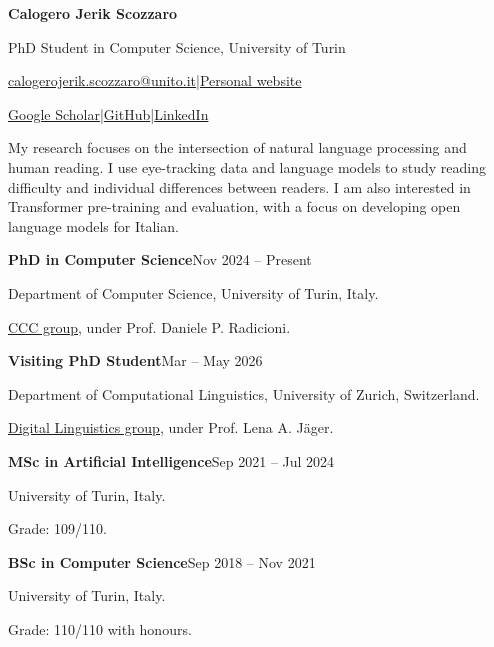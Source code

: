 \documentclass[10pt,a4paper]{article}
\newcommand{\cvsection}[1]{\par\vspace{14pt}{\large\bfseries #1}\par\vspace{4pt}{\color{rulecolor}\hrule}\vspace{8pt}}
\newcommand{\education}[4]{\par\textbf{#1}\hfill{\small\color{muted}#2}\par #3\par{\small\color{muted}#4}\par\vspace{7pt}}
\newcommand{\applicationdetails}{}
\begin{document}
\color{ink}
{\fontsize{25}{29}\selectfont\bfseries Calogero Jerik Scozzaro}\par
\vspace{4pt}
{\color{muted}PhD Student in Computer Science, University of Turin}\par
\vspace{5pt}
{\small\href{mailto:calogerojerik.scozzaro@unito.it}{calogerojerik.scozzaro@unito.it}\enspace\textcolor{muted}{|}\enspace\href{https://calogero-jerik-scozzaro.github.io/}{Personal website}}\par
{\small\href{https://scholar.google.com/citations?user=m3dCkVYAAAAJ}{Google Scholar}\enspace\textcolor{muted}{|}\enspace\href{https://github.com/calogero-jerik-scozzaro}{GitHub}\enspace\textcolor{muted}{|}\enspace\href{https://www.linkedin.com/in/calogero-jerik-scozzaro}{LinkedIn}}\par
\applicationdetails

\cvsection{Research interests}
My research focuses on the intersection of natural language processing and human reading. I use eye-tracking data and language models to study reading difficulty and individual differences between readers. I am also interested in Transformer pre-training and evaluation, with a focus on developing open language models for Italian.

\cvsection{Education}
\education{PhD in Computer Science}{Nov 2024 -- Present}{Department of Computer Science, University of Turin, Italy.}{\href{https://ccc.di.unito.it}{CCC group}, under Prof. Daniele P. Radicioni.}
\education{Visiting PhD Student}{Mar -- May 2026}{Department of Computational Linguistics, University of Zurich, Switzerland.}{\href{https://www.cl.uzh.ch/en/research-groups/digital-linguistics.html}{Digital Linguistics group}, under Prof. Lena A. J\"ager.}
\education{MSc in Artificial Intelligence}{Sep 2021 -- Jul 2024}{University of Turin, Italy.}{Grade: 109/110.}
\education{BSc in Computer Science}{Sep 2018 -- Nov 2021}{University of Turin, Italy.}{Grade: 110/110 with honours.}
\end{document}

